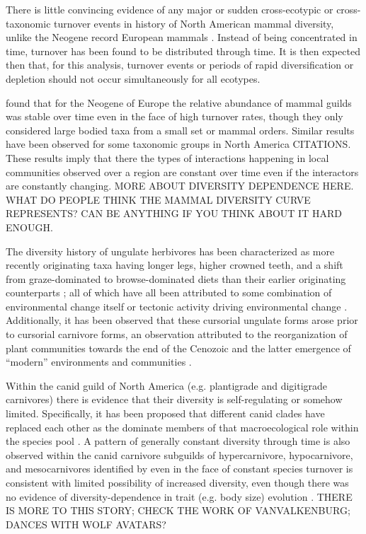 \documentclass[12pt,letterpaper]{article}
\begin{document}
There is little convincing evidence of any major or sudden cross-ecotypic or cross-taxonomic turnover events in history of North American mammal diversity, unlike the Neogene record European mammals \citep{Alroy2009,Alroy1996a,Eronen2015,Janis1993b,Alroy2000g}. Instead of being concentrated in time, turnover has been found to be distributed through time. It is then expected then that, for this analysis, turnover events or periods of rapid diversification or depletion should not occur simultaneously for all ecotypes.

\citet{Jernvall2004} found that for the Neogene of Europe the relative abundance of mammal guilds was stable over time even in the face of high turnover rates, though they only considered large bodied taxa from a small set or mammal orders. Similar results have been observed for some taxonomic groups in North America CITATIONS. These results imply that there the types of interactions happening in local communities observed over a region are constant over time even if the interactors are constantly changing. \uppercase{more about diversity dependence here. what do people think the mammal diversity curve represents? can be anything if you think about it hard enough}.

The diversity history of ungulate herbivores has been characterized as more recently originating taxa having longer legs, higher crowned teeth, and a shift from graze-dominated to browse-dominated diets than their earlier originating counterparts \citep{Janis2004,Janis2000,Janis1993c,Janis2008a,Cantalapiedra2017,Fraser2015a}; all of which have all been attributed to some combination of environmental change itself or tectonic activity driving environmental change \citep{Janis2008a,Eronen2015,Blois2009,Badgley2017}. Additionally, it has been observed that these cursorial ungulate forms arose prior to cursorial carnivore forms, an observation attributed to the reorganization of plant communities towards the end of the Cenozoic and the latter emergence of ``modern'' environments and communities \citep{Janis1993c}.

Within the canid guild of North America (e.g. plantigrade and digitigrade carnivores) there is evidence that their diversity is self-regulating or somehow limited. Specifically, it has been proposed that different canid clades have replaced each other as the dominate members of that macroecological role within the species pool \citep{Silvestro2015b}. A pattern of generally constant diversity through time is also observed within the canid carnivore subguilds of hypercarnivore, hypocarnivore, and mesocarnivores identified by \citet{Slater2015c} even in the face of constant species turnover is consistent with limited possibility of increased diversity, even though there was no evidence of diversity-dependence in trait (e.g. body size) evolution \citep{Slater2015c}. \uppercase{there is more to this story; check the work of vanvalkenburg; dances with wolf avatars?}
\end{document}
